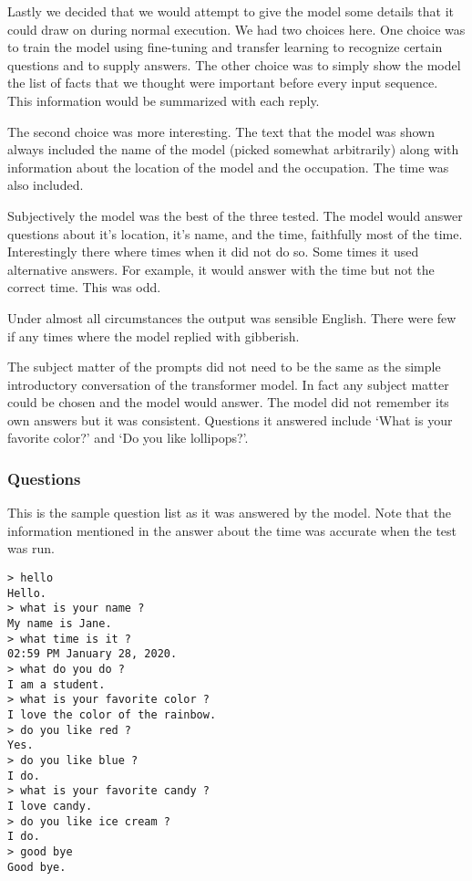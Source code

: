 Lastly we decided that we would attempt to give the model some details that it could draw on during normal execution. We had two choices here. One choice was to train the model using fine-tuning and transfer learning to recognize certain questions and to supply answers. The other choice was to simply show the model the list of facts that we thought were important before every input sequence. This information would be summarized with each reply.

The second choice was more interesting. The text that the model was shown always included the name of the model (picked somewhat arbitrarily) along with information about the location of the model and the occupation. The time was also included.

Subjectively the model was the best of the three tested. The model would answer questions about it's location, it's name, and the time, faithfully most of the time. Interestingly there where times when it did not do so. Some times it used alternative answers. For example, it would answer with the time but not the correct time. This was odd.

Under almost all circumstances the output was sensible English. There were few if any times where the model replied with gibberish. 

The subject matter of the prompts did not need to be the same as the simple introductory conversation of the transformer model. In fact any subject matter could be chosen and the model would answer. The model did not remember its own answers but it was consistent. Questions it answered include `What is your favorite color?' and `Do you like lollipops?'. 

\subsubsection*{Questions}
This is the sample question list as it was answered by the model. Note that the information mentioned in the answer about the time was accurate when the test was run.

\begin{verbatim}
> hello
Hello.
> what is your name ?
My name is Jane.
> what time is it ?
02:59 PM January 28, 2020.
> what do you do ?
I am a student.
> what is your favorite color ?
I love the color of the rainbow.
> do you like red ?
Yes.
> do you like blue ?
I do.
> what is your favorite candy ?
I love candy.
> do you like ice cream ?
I do. 
> good bye
Good bye.
\end{verbatim}

